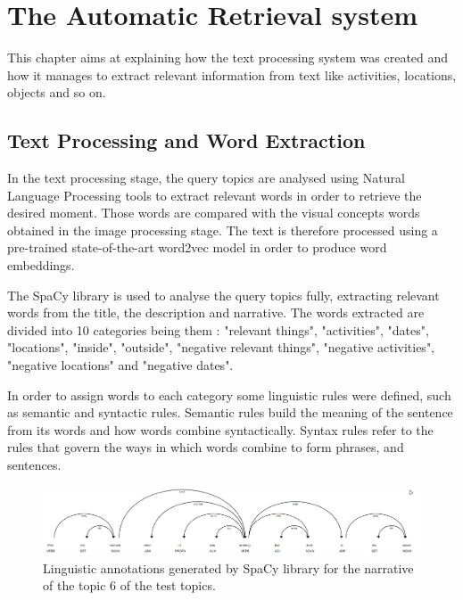 \chapter{The Automatic Retrieval system}

This chapter aims at explaining how the text processing system was created and how it manages to extract relevant information from text like activities, locations, objects and so on.



\section{Text Processing and Word Extraction}

In the text processing stage, the query topics are analysed using Natural Language Processing tools to extract relevant words in order to retrieve the desired moment. Those words are compared with the visual concepts words obtained in the image processing stage. The text is therefore processed using a pre-trained state-of-the-art word2vec model in order to produce word embeddings.

The SpaCy library is used to analyse the query topics fully, extracting relevant words from the title, the description and narrative. The words extracted are divided into 10 categories being them : "relevant things", "activities", "dates", "locations", "inside", "outside", "negative relevant things", "negative activities", "negative locations" and "negative dates".

In order to assign words to each category some linguistic rules were defined,
such as semantic and syntactic rules. Semantic rules build the meaning of the
sentence from its words and how words combine syntactically. Syntax rules refer to
the rules that govern the ways in which words combine to form phrases, and
sentences. 

\begin{figure}[H]
    \centering
    \captionsetup{justification=centering}
    \includegraphics[width = 0.9 \textwidth]{Sections/6textprocessing/images/spacy.png}
    \caption{Linguistic annotations generated by SpaCy library for the narrative of the topic 6 of the test topics.}
    \label{fig:spacy_labels}
  \end{figure}
  
